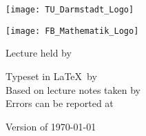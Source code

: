 \makeatletter
\renewcommand*\and{\unskip, }
\begin{titlepage}
\recalctypearea
\centering

	\texttt{[image: TU\_Darmstadt\_Logo]}

\vspace{1cm}

	\texttt{[image: FB\_Mathematik\_Logo]}

\vspace{3.5cm}

	{\Huge{} \@title}

\vspace{0.5cm}

	{ \@subtitle}

\vspace{0.5cm}

	{ Lecture held by \@lecturer}

\vspace{1.0cm}

	\begingroup
	\small
	Typeset in \LaTeX\ by \@setter\\
	Based on lecture notes taken by \@notetaker\\
	Errors can be reported at \mailto{\@email}
	\endgroup

\vfill

	{\small Version of \today}
\end{titlepage}
\makeatother
